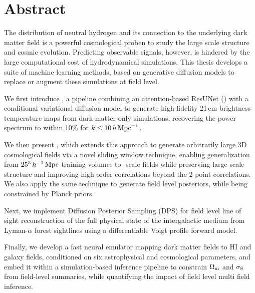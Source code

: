 
\chapter*{Abstract}
\noindent

The distribution of neutral hydrogen and its connection to the underlying
dark matter field is a powerful cosmological proben to study the large scale structure and cosmic evolution. Predicting observable
signals, however, is hindered by the large computational cost of
hydrodynamical simulations. This thesis develops a suite of machine
learning methods, based on generative diffusion models to replace
or augment these simulations at field level.

We first introduce \LODI, a pipeline combining an attention-based ResUNet
(\HALOgen) with a conditional variational diffusion model to generate
high-fidelity 21\,cm brightness temperature maps from dark matter-only
simulations, recovering the power spectrum to within 10\% for
$k \leq 10\,h\,\mathrm{Mpc}^{-1}$.

We then present \FOLD, which extends this approach to generate
arbitrarily large 3D cosmological fields via a novel sliding window technique, enabling generalization from $25^3\,h^{-1}\,\mathrm{Mpc}$ training volumes to
-scale fields while preserving large-scale structure and improving high order correlations beyond the 2 point correlations.
We also apply the same \FOLD technique to generate field level posteriors, while being constrained by Planck priors.   

Next, we implement Diffusion Posterior Sampling (DPS) for
field level line of sight reconstruction of the full physical state of the intergalactic medium from Lyman-$\alpha$ forest sightlines using a differentiable Voigt profile forward model.

Finally, we develop a fast neural emulator mapping dark matter fields to HI
and galaxy fields, conditioned on six astrophysical and cosmological
parameters, and embed it within a simulation-based inference pipeline to
constrain $\Omega_\mathrm{m}$ and $\sigma_8$ from field-level summaries, while quantifying the impact of field level multi field inference.